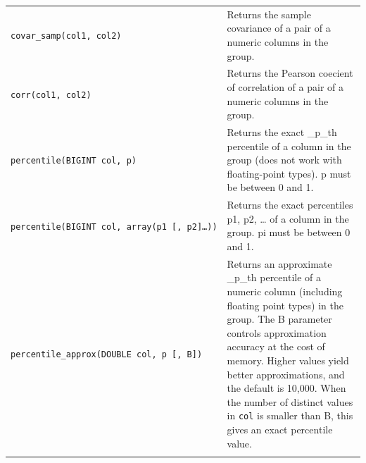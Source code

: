\documentclass[
]{article}
\begin{document}
\begin{longtable}[]{@{}ll@{}}
\begin{minipage}[t]{0.39\columnwidth}\raggedright
\texttt{covar\_samp(col1,\ col2)}\strut
\end{minipage} & \begin{minipage}[t]{0.55\columnwidth}\raggedright
Returns the sample covariance of a pair of a numeric columns in the
group.\strut
\end{minipage}\tabularnewline
\begin{minipage}[t]{0.39\columnwidth}\raggedright
\texttt{corr(col1,\ col2)}\strut
\end{minipage} & \begin{minipage}[t]{0.55\columnwidth}\raggedright
Returns the Pearson coecient of correlation of a pair of a numeric
columns in the group.\strut
\end{minipage}\tabularnewline
\begin{minipage}[t]{0.39\columnwidth}\raggedright
\texttt{percentile(BIGINT\ col,\ p)}\strut
\end{minipage} & \begin{minipage}[t]{0.55\columnwidth}\raggedright
Returns the exact \_p\_th percentile of a column in the group (does not
work with floating-point types). p must be between 0 and 1.\strut
\end{minipage}\tabularnewline
\begin{minipage}[t]{0.39\columnwidth}\raggedright
\texttt{percentile(BIGINT\ col,\ array(p1\ {[},\ p2{]}\ldots{}))}\strut
\end{minipage} & \begin{minipage}[t]{0.55\columnwidth}\raggedright
Returns the exact percentiles p1, p2, \ldots{} of a column in the group.
pi must be between 0 and 1.\strut
\end{minipage}\tabularnewline
\begin{minipage}[t]{0.39\columnwidth}\raggedright
\texttt{percentile\_approx(DOUBLE\ col,\ p\ {[},\ B{]})}\strut
\end{minipage} & \begin{minipage}[t]{0.55\columnwidth}\raggedright
Returns an approximate \_p\_th percentile of a numeric column (including
floating point types) in the group. The B parameter controls
approximation accuracy at the cost of memory. Higher values yield better
approximations, and the default is 10,000. When the number of distinct
values in \texttt{col} is smaller than B, this gives an exact percentile
value.\strut
\end{minipage}\tabularnewline
\begin{minipage}[t]{0.39\columnwidth}\raggedright

\end{minipage}
\end{longtable}
\end{document}
